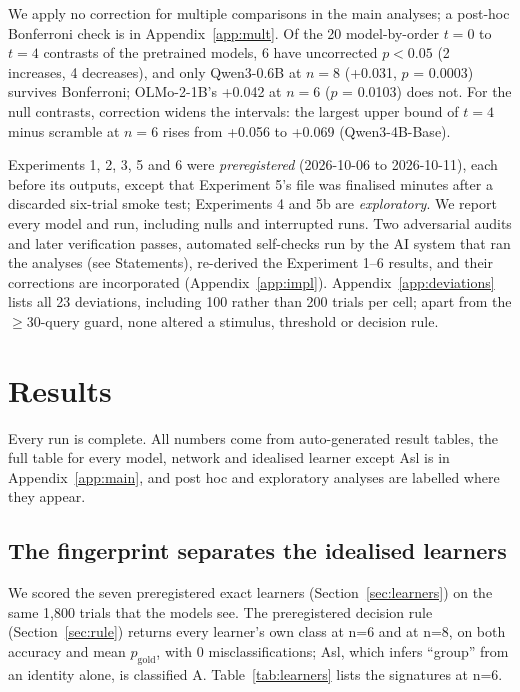 \documentclass[11pt]{article}
\begin{document}
We apply no correction for multiple comparisons in the main analyses; a post-hoc Bonferroni check is in Appendix~\ref{app:mult}. Of the 20 model-by-order $t = 0$ to $t = 4$ contrasts of the pretrained models, 6 have uncorrected $p < 0.05$ (2 increases, 4 decreases), and only Qwen3-0.6B at $n = 8$ (+0.031, $p$ = 0.0003) survives Bonferroni; OLMo-2-1B's +0.042 at $n = 6$ ($p$ = 0.0103) does not. For the null contrasts, correction widens the intervals: the largest upper bound of $t = 4$ minus scramble at $n = 6$ rises from +0.056 to +0.069 (Qwen3-4B-Base).

Experiments 1, 2, 3, 5 and 6 were \emph{preregistered} (2026-10-06 to 2026-10-11), each before its outputs, except that Experiment 5's file was finalised minutes after a discarded six-trial smoke test; Experiments 4 and 5b are \emph{exploratory}. We report every model and run, including nulls and interrupted runs. Two adversarial audits and later verification passes, automated self-checks run by the AI system that ran the analyses (see Statements), re-derived the Experiment 1--6 results, and their corrections are incorporated (Appendix~\ref{app:impl}). Appendix~\ref{app:deviations} lists all 23 deviations, including 100 rather than 200 trials per cell; apart from the $\geq$30-query guard, none altered a stimulus, threshold or decision rule.

\section{Results}\label{sec:results}

Every run is complete. All numbers come from auto-generated result tables, the full table for every model, network and idealised learner except Asl is in Appendix~\ref{app:main}, and post hoc and exploratory analyses are labelled where they appear.

\subsection{The fingerprint separates the idealised learners}\label{sec:r-ideal}

We scored the seven preregistered exact learners (Section~\ref{sec:learners}) on the same 1,800 trials that the models see. The preregistered decision rule (Section~\ref{sec:rule}) returns every learner's own class at n=6 and at n=8, on both accuracy and mean $p_{\mathrm{gold}}$, with 0 misclassifications; Asl, which infers ``group'' from an identity alone, is classified A. Table~\ref{tab:learners} lists the signatures at n=6.
\end{document}
